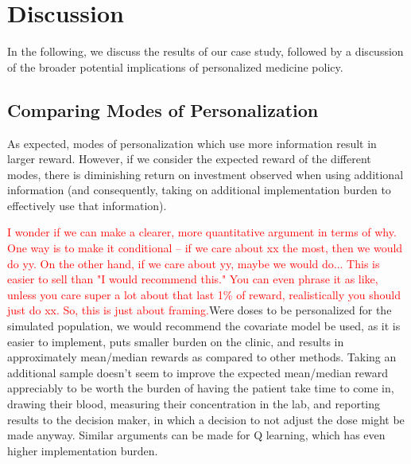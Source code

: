 \section{Discussion}\label{ss:discussion}


In the following, we discuss the results of our case study, followed by a discussion of the broader potential implications of personalized medicine policy.

\subsection{Comparing Modes of Personalization}

As expected, modes of personalization which use more information result in larger reward. However, if we consider the expected reward of the different modes, there is diminishing return on investment observed when using additional information (and consequently, taking on additional implementation burden to effectively use that information). 

\textcolor{red}{I wonder if we can make a clearer, more quantitative argument in terms of why. One way is to make it conditional -- if we care about xx the most, then we would do yy. On the other hand, if we care about yy, maybe we would do... This is easier to sell than "I would recommend this." You can even phrase it as like, unless you care super a lot about that last 1\% of reward, realistically you should just do xx. So, this is just about framing.}Were doses to be personalized for the simulated population, we would recommend the covariate model be used, as it is easier to implement, puts smaller burden on the clinic, and results in approximately mean/median rewards as compared to other methods.  Taking an additional sample doesn’t seem to improve the expected mean/median reward appreciably to be worth the burden of having the patient take time to come in, drawing their blood, measuring their concentration in the lab, and reporting results to the decision maker, in which a decision to not adjust the dose might be made anyway. Similar arguments can be made for Q learning, which has even higher implementation burden.

